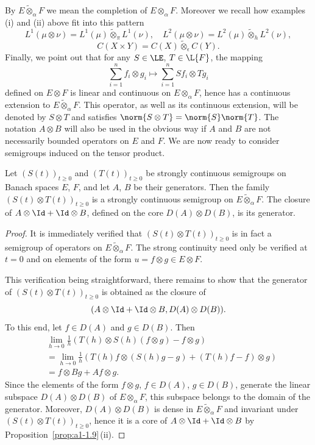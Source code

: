 By $E \widetilde{\otimes}_{\alpha} F$ we mean the completion of\/ $E \otimes_{\alpha} F$. 
Moreover we recall how examples (i) and (ii) above fit into this pattern
\[
    L^{1}(\mu \otimes \nu) = L^{1}(\mu) \widetilde{\otimes}_{\pi} L^{1}(\nu), 
    \quad L^{2}(\mu \otimes \nu) = L^{2}(\mu) \widetilde{\otimes}_{h} L^{2}(\nu),
\]
\[
    C(X \times Y) = C(X) \widetilde{\otimes}_{\epsilon} C(Y).
\]
Finally, we point out that for any $S \in \LE$, $T \in \L{F} $, the mapping
\[
    \sum_{i=1}^{n}f_{i} \otimes g_{i} \mapsto \sum_{i=1}^{n}Sf_{i} \otimes Tg_{i}
\]
defined on $E \otimes F$ is linear and continuous on $E \otimes_{\alpha} F$, hence has a continuous extension to $ E \widetilde{\otimes}_{\alpha} F$. 
This operator, as well as its continuous extension, will be denoted by $S \otimes T$ and satisfies $\norm{S \otimes T} = \norm{S} \norm{T}$. 
The notation $A \otimes B$ will also be used in the obvious way if\/ $A$ and $B$ are not necessarily bounded operators on $E$ and $F$. 
We are now ready to consider semigroups induced on the tensor product.
\begin{proposition*}\label{prop:a1-3.7}
Let $(S(t))_{t\geq 0}$ and $(T(t))_{t\geq 0}$ be strongly continuous semigroups on Banach spaces $E$, $F$, and let $A$, $B$ be their generators. 
Then the family $(S(t) \otimes T(t))_{t\geq 0}$ is a strongly continuous semigroup on 
$ E \widetilde{\otimes}_{\alpha} F $.
The closure of\/ $A \otimes \Id + \Id \otimes B$, defined on the core $D(A) \otimes D(B)$, is its generator.
\end{proposition*}
\begin{proof}
It is immediately verified that $(S(t)\otimes T(t))_{t\geq 0}$ is in fact a semigroup of operators on 
$ E \widetilde{\otimes}_{\alpha} F $. 
The strong continuity need only be verified at $t = 0$ and on elements of the form $u = f \otimes g \in E \otimes F$.

This verification being straightforward, there remains to show that the generator of\/ $(S(t)\otimes T(t))_{t\geq 0}$ is obtained as the closure of 
%
\[
	(A \otimes \Id + \Id \otimes B,D(A) \otimes D(B)) .
\]
%
To this end, let $f \in D(A)$ and $g \in D(B)$. 
Then
\begin{align*}
    &\lim_{h\to 0} \frac{1}{h}(T(h) \otimes S(h)(f \otimes g)-f \otimes g) \\
    &= \lim_{h\to 0} \frac{1}{h}(T(h)f \otimes (S(h)g-g) + (T(h)f-f) \otimes g) \\
    &= f \otimes Bg + Af \otimes g.
\end{align*}
Since the elements of the form $f \otimes g$, $f \in D(A)$, $g \in D(B)$, generate the linear subspace $D(A) \otimes D(B)$ of\/ $E \otimes_{\alpha} F$, this subspace belongs to the domain of the generator.
Moreover, $D(A) \otimes D(B)$ is dense in $E \widetilde{\otimes}_{\alpha} F$ and invariant under $(S(t)\otimes T(t))_{t\geq 0}$, hence it is a core of\/ $A \otimes \Id + \Id \otimes B$ by Proposition~\ref{prop:a1-1.9}\,(ii).
\end{proof}
